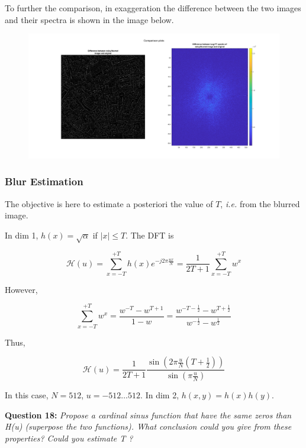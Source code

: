 To further the comparison, in exaggeration the difference between the two images and their spectra is shown in the image below.

\begin{figure}[H]
    \centering
    \includegraphics[width=0.75\linewidth]{Doc/Graphics/Part1/Q17b.png}
\end{figure}

\subsubsection{Blur Estimation}
The objective is here to estimate a posteriori the value of $T$, \textit{i.e.} from the blurred image.

\noindent In dim 1, $h(x) = \sqrt{\alpha}$ if $|x| \leq T$. The DFT is

\begin{equation}
\label{eq:DFT}
\mathcal{H}(u) = \sum_{x=-T}^{+T} h(x)e^{-j 2\pi \frac{ux}{N}} = \frac{1}{2T+1} \sum_{x=-T}^{+T} w^x
\end{equation}

However,

\[
\sum_{x=-T}^{+T} w^x = \frac{w^{-T} - w^{T+1}}{1 - w} = \frac{w^{-T-\frac{1}{2}} - w^{T+\frac{1}{2}}}{w^{-\frac{1}{2}} - w^{\frac{1}{2}}}
\]

Thus,

\begin{equation}
\label{eq:H(u)}
\mathcal{H}(u) = \frac{1}{2T+1} \frac{\sin\left(2\pi \frac{u}{N} (T + \frac{1}{2})\right)}{\sin\left(\pi \frac{u}{N}\right)}
\end{equation}

In this case, $N = 512$, $u = -512 \dots 512$. In dim 2, $h(x,y) = h(x)h(y)$.

\textbf{Question 18:}
\textit{Propose a cardinal sinus function that have the same zeros than H(u) (superpose the two functions). What conclusion could you give from these properties? Could you estimate T ?}

